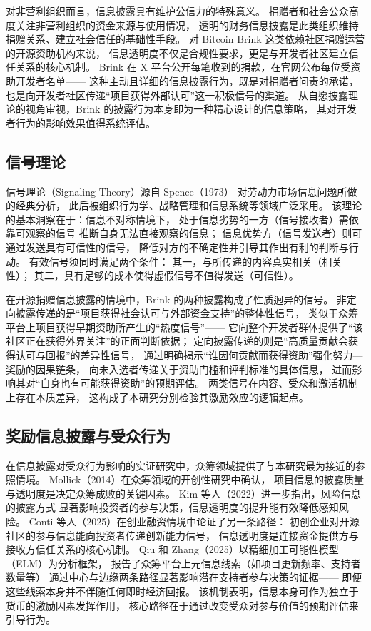 对非营利组织而言，信息披露具有维护公信力的特殊意义。
捐赠者和社会公众高度关注非营利组织的资金来源与使用情况，
透明的财务信息披露是此类组织维持捐赠关系、建立社会信任的基础性手段\cite{liu2015nonprofit}。
对 Bitcoin Brink 这类依赖社区捐赠运营的开源资助机构来说，
信息透明度不仅是合规性要求，更是与开发者社区建立信任关系的核心机制。
Brink 在 X 平台公开每笔收到的捐款，在官网公布每位受资助开发者名单——
这种主动且详细的信息披露行为，既是对捐赠者问责的承诺，
也是向开发者社区传递“项目获得外部认可”这一积极信号的渠道。
从自愿披露理论的视角审视，Brink 的披露行为本身即为一种精心设计的信息策略，
其对开发者行为的影响效果值得系统评估。

\subsection{信号理论}

信号理论（Signaling Theory）源自 Spence（1973）
对劳动力市场信息问题所做的经典分析\cite{spence1973job}，
此后被组织行为学、战略管理和信息系统等领域广泛采用。
该理论的基本洞察在于：信息不对称情境下，
处于信息劣势的一方（信号接收者）需依靠可观察的信号
推断自身无法直接观察的信息；
信息优势方（信号发送者）则可通过发送具有可信性的信号，
降低对方的不确定性并引导其作出有利的判断与行动。
有效信号须同时满足两个条件：
其一，与所传递的内容真实相关（相关性）；
其二，具有足够的成本使得虚假信号不值得发送（可信性）\cite{connelly2011signaling}。

在开源捐赠信息披露的情境中，Brink 的两种披露构成了性质迥异的信号。
非定向披露传递的是“项目获得社会认可与外部资金支持”的整体性信号，
类似于众筹平台上项目获得早期资助所产生的“热度信号”——
它向整个开发者群体提供了“该社区正在获得外界关注”的正面判断依据；
定向披露传递的则是“高质量贡献会获得认可与回报”的差异性信号，
通过明确揭示“谁因何贡献而获得资助”强化努力—奖励的因果链条，
向未入选者传递关于资助门槛和评判标准的具体信息，
进而影响其对“自身也有可能获得资助”的预期评估。
两类信号在内容、受众和激活机制上存在本质差异，
这构成了本研究分别检验其激励效应的逻辑起点。

\subsection{奖励信息披露与受众行为}

在信息披露对受众行为影响的实证研究中，众筹领域提供了与本研究最为接近的参照情境。
Mollick（2014）在众筹领域的开创性研究中确认，
项目信息的披露质量与透明度是决定众筹成败的关键因素\cite{mollick2014dynamics}。
Kim 等人（2022）进一步指出，风险信息的披露方式
显著影响投资者的参与决策，信息透明度的提升能有效降低感知风险\cite{kim2022risk}。
Conti 等人（2025）在创业融资情境中论证了另一条路径：
初创企业对开源社区的参与信息能向投资者传递创新能力信号，
信息透明度是连接资金提供方与接收方信任关系的核心机制\cite{conti2025beefing}。
Qiu 和 Zhang（2025）以精细加工可能性模型（ELM）为分析框架，
报告了众筹平台上元信息线索（如项目更新频率、支持者数量等）
通过中心与边缘两条路径显著影响潜在支持者参与决策的证据——
即便这些线索本身并不伴随任何即时经济回报\cite{qiu2025crowdfunding}。
该机制表明，信息本身可作为独立于货币的激励因素发挥作用，
核心路径在于通过改变受众对参与价值的预期评估来引导行为。

